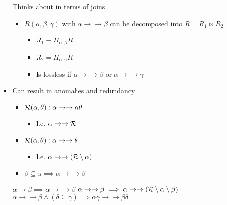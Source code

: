\begin{itemize}
\begin{itemize}
\begin{itemize}
\begin{itemize}
\begin{itemize}
                                \end{itemize}
                        \end{itemize}
                     Thinks about in terms of joins
                        \begin{itemize}
                            \item $R(\alpha, \beta, \gamma)$ with $\alpha \to \to \beta$ can be decomposed into $R = R_1 \bowtie R_2$
                                \begin{itemize}
                                    \item $R_1 = \Pi_{\alpha, \beta} R$
                                    \item $R_2 = \Pi_{\alpha, \gamma} R$
                                    \item Is lossless if $\alpha \to \to \beta$ or $\alpha \to \to \gamma$
                                \end{itemize}
                        \end{itemize}
                    \item Can result in anomalies and redundancy
                        \begin{itemize}
                            \item $\mathcal{R}(\alpha, \theta): \alpha \to \to \alpha \theta$
                                \begin{itemize}
                                    \item I.e. $\alpha \to \to \mathcal{R}$
                                \end{itemize}
                            \item $\mathcal{R}(\alpha, \theta): \alpha \to \to \theta$
                                \begin{itemize}
                                    \item I.e. $\alpha \to \to (\mathcal{R} \setminus \alpha)$
                                \end{itemize}
                            \item $\beta \subseteq \alpha \implies \alpha \to \to \beta$
                        \end{itemize}
                     $\alpha \to \beta \implies \alpha \to \to \beta$
                     $\alpha \to \to \beta \implies \alpha \to \to (\mathcal{R} \setminus \alpha \setminus \beta)$
                     $\alpha \to \to \beta \wedge (\delta \subseteq \gamma) \implies \alpha \gamma \to \to \beta \delta$

\end{itemize}
\end{itemize}
\end{itemize}
